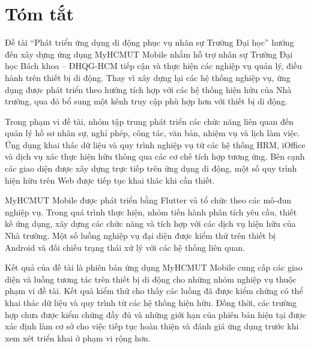 \newpage

\section*{\Huge Tóm tắt}

Đề tài ``Phát triển ứng dụng di động phục vụ nhân sự Trường Đại học'' hướng đến xây dựng ứng dụng MyHCMUT Mobile nhằm hỗ trợ nhân sự Trường Đại học Bách khoa -- ĐHQG-HCM tiếp cận và thực hiện các nghiệp vụ quản lý, điều hành trên thiết bị di động. Thay vì xây dựng lại các hệ thống nghiệp vụ, ứng dụng được phát triển theo hướng tích hợp với các hệ thống hiện hữu của Nhà trường, qua đó bổ sung một kênh truy cập phù hợp hơn với thiết bị di động.

Trong phạm vi đề tài, nhóm tập trung phát triển các chức năng liên quan đến quản lý hồ sơ nhân sự, nghỉ phép, công tác, văn bản, nhiệm vụ và lịch làm việc. Ứng dụng khai thác dữ liệu và quy trình nghiệp vụ từ các hệ thống HRM, iOffice và dịch vụ xác thực hiện hữu thông qua các cơ chế tích hợp tương ứng. Bên cạnh các giao diện được xây dựng trực tiếp trên ứng dụng di động, một số quy trình hiện hữu trên Web được tiếp tục khai thác khi cần thiết.

MyHCMUT Mobile được phát triển bằng Flutter và tổ chức theo các mô-đun nghiệp vụ. Trong quá trình thực hiện, nhóm tiến hành phân tích yêu cầu, thiết kế ứng dụng, xây dựng các chức năng và tích hợp với các dịch vụ hiện hữu của Nhà trường. Một số luồng nghiệp vụ đại diện được kiểm thử trên thiết bị Android và đối chiếu trạng thái xử lý với các hệ thống liên quan.

Kết quả của đề tài là phiên bản ứng dụng MyHCMUT Mobile cung cấp các giao diện và luồng tương tác trên thiết bị di động cho những nhóm nghiệp vụ thuộc phạm vi đề tài. Kết quả kiểm thử cho thấy các luồng đã được kiểm chứng có thể khai thác dữ liệu và quy trình từ các hệ thống hiện hữu. Đồng thời, các trường hợp chưa được kiểm chứng đầy đủ và những giới hạn của phiên bản hiện tại được xác định làm cơ sở cho việc tiếp tục hoàn thiện và đánh giá ứng dụng trước khi xem xét triển khai ở phạm vi rộng hơn.
